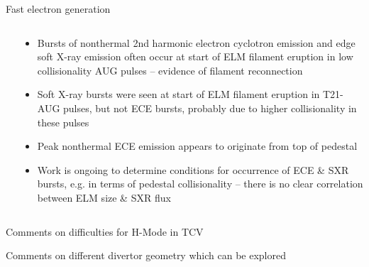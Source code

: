 \documentclass[10pt, compress]{beamer}
\newcommand\Fontvi{\fontsize{8}{7.2}\selectfont}
\begin{document}
\begin{frame}{Fast electron generation}
\Fontvi
  \begin{columns}
    \begin{column}{0.5\textwidth}
    \end{column}
    \begin{column}{0.5\textwidth}
\begin{itemize}
      \item Bursts of nonthermal 2nd harmonic electron cyclotron emission and edge soft X-ray emission often occur at start of ELM filament eruption in low collisionality AUG pulses – evidence of filament reconnection
\item Soft X-ray bursts were seen at start of ELM filament eruption in T21-AUG pulses, but not ECE bursts, probably due to higher collisionality in these pulses
\item Peak nonthermal ECE emission appears to originate from top of pedestal
\item Work is ongoing to determine conditions for occurrence of ECE \& SXR bursts, e.g. in terms of pedestal collisionality – there is no clear correlation between ELM size \& SXR flux
\end{itemize}
\end{column}

  \end{columns}
\end{frame}

\begin{frame}{Comments on difficulties for H-Mode in TCV}

\end{frame}
\begin{frame}{Comments on different divertor geometry which can be explored}

\end{frame}
\end{document}
